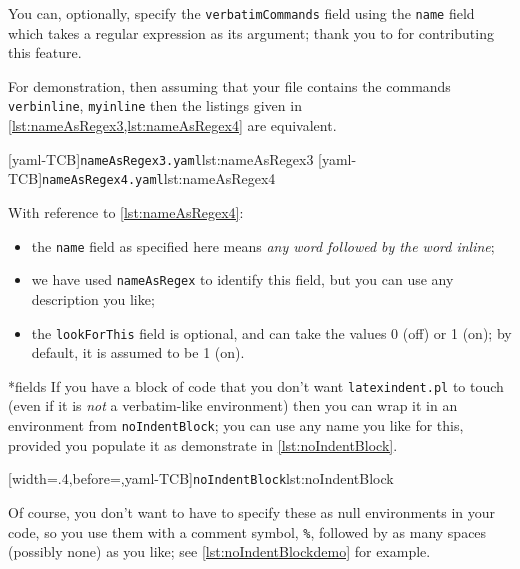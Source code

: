 \documentclass[10pt]{article}
\begin{document}
 You can, optionally, specify  the
 \texttt{verbatimCommands} field using the \texttt{name} field which takes a regular
 expression as its argument; thank you to \cite{XuehaiPan} for contributing this feature.

 \begin{example}
 For demonstration, then assuming that your file contains the commands
 \texttt{verbinline}, \texttt{myinline} then the listings given in
 \cref{lst:nameAsRegex3,lst:nameAsRegex4} are equivalent.

 \begin{cmhtcbraster}[raster column skip=.1\linewidth]
  [yaml-TCB]{\texttt{nameAsRegex3.yaml}}{lst:nameAsRegex3}
  [yaml-TCB]{\texttt{nameAsRegex4.yaml}}{lst:nameAsRegex4}
 \end{cmhtcbraster}

 With reference to \cref{lst:nameAsRegex4}:
 \begin{itemize}
  \item the \texttt{name} field as specified here means \emph{any word followed by the
        word inline};
  \item we have used \texttt{nameAsRegex} to identify this field, but you can use any
        description you like;
  \item the \texttt{lookForThis} field is optional, and can take the values 0 (off) or 1
        (on); by default, it is assumed to be 1 (on).
 \end{itemize}
 \end{example}

*{fields}
 If you have a block of code that you don't want \texttt{latexindent.pl} to touch (even
 if  it is \emph{not} a verbatim-like environment) then you
 can wrap it in an environment from \texttt{noIndentBlock}; you can use any name you like
 for this, provided you populate it as demonstrate in \cref{lst:noIndentBlock}.

 [width=.4\linewidth,before=\centering,yaml-TCB]{\texttt{noIndentBlock}}{lst:noIndentBlock}

 Of course, you don't want to have to specify these as null environments in your code, so
 you use them with a comment symbol, \lstinline!%!, followed by as many spaces (possibly
 none) as you like; see \cref{lst:noIndentBlockdemo} for example.
\end{document}
